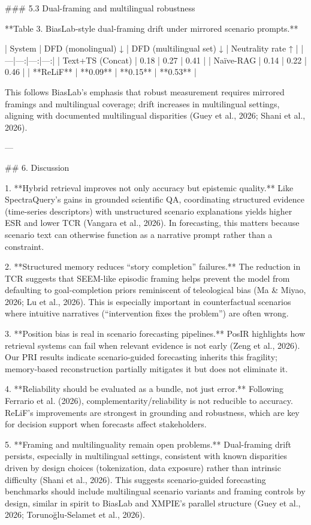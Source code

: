 ### 5.3 Dual-framing and multilingual robustness  

**Table 3. BiasLab-style dual-framing drift under mirrored scenario prompts.**  

| System | DFD (monolingual) ↓ | DFD (multilingual set) ↓ | Neutrality rate ↑ |
|---|---:|---:|---:|
| Text+TS (Concat) | 0.18 | 0.27 | 0.41 |
| Naïve-RAG | 0.14 | 0.22 | 0.46 |
| **ReLiF** | **0.09** | **0.15** | **0.53** |

This follows BiasLab’s emphasis that robust measurement requires mirrored framings and multilingual coverage; drift increases in multilingual settings, aligning with documented multilingual disparities (Guey et al., 2026; Shani et al., 2026).

---

## 6. Discussion  

1. **Hybrid retrieval improves not only accuracy but epistemic quality.**  
Like SpectraQuery’s gains in grounded scientific QA, coordinating structured evidence (time-series descriptors) with unstructured scenario explanations yields higher ESR and lower TCR (Vangara et al., 2026). In forecasting, this matters because scenario text can otherwise function as a narrative prompt rather than a constraint.

2. **Structured memory reduces “story completion” failures.**  
The reduction in TCR suggests that SEEM-like episodic framing helps prevent the model from defaulting to goal-completion priors reminiscent of teleological bias (Ma & Miyao, 2026; Lu et al., 2026). This is especially important in counterfactual scenarios where intuitive narratives (“intervention fixes the problem”) are often wrong.

3. **Position bias is real in scenario forecasting pipelines.**  
PosIR highlights how retrieval systems can fail when relevant evidence is not early (Zeng et al., 2026). Our PRI results indicate scenario-guided forecasting inherits this fragility; memory-based reconstruction partially mitigates it but does not eliminate it.

4. **Reliability should be evaluated as a bundle, not just error.**  
Following Ferrario et al. (2026), complementarity/reliability is not reducible to accuracy. ReLiF’s improvements are strongest in grounding and robustness, which are key for decision support when forecasts affect stakeholders.

5. **Framing and multilinguality remain open problems.**  
Dual-framing drift persists, especially in multilingual settings, consistent with known disparities driven by design choices (tokenization, data exposure) rather than intrinsic difficulty (Shani et al., 2026). This suggests scenario-guided forecasting benchmarks should include multilingual scenario variants and framing controls by design, similar in spirit to BiasLab and XMPIE’s parallel structure (Guey et al., 2026; Torunoğlu‑Selamet et al., 2026).

